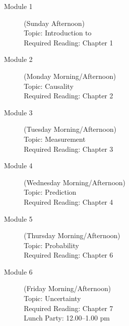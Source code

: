 \documentclass[12pt]{article}
\begin{document}
\begin{description}
\item[Module 1] (Sunday Afternoon)\hfill \\
Topic:  Introduction to \R\\%
Required Reading: Chapter 1 \\

\item[Module 2] (Monday Morning/Afternoon)\hfill \\
Topic: Causality\\
Required Reading: Chapter 2 \\

\item[Module 3] (Tuesday Morning/Afternoon) \hfill \\
Topic: Measurement\\
Required Reading: Chapter 3\\

\item[Module 4] (Wednesday Morning/Afternoon)\hfill \\
Topic: Prediction \\
Required Reading: Chapter 4 \\

\item[Module 5] (Thursday Morning/Afternoon) \hfill \\
Topic: Probability\\
Required Reading: Chapter 6\\

\item[Module 6] (Friday Morning/Afternoon) \hfill \\
Topic: Uncertainty\\
Required Reading: Chapter 7\\
Lunch Party: 12.00--1.00 pm\\
\end{description}
\end{document}
